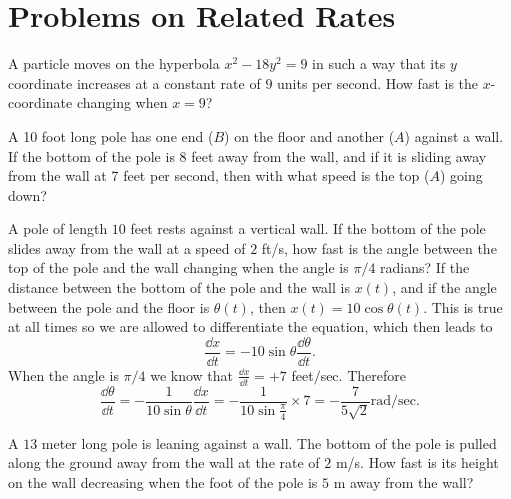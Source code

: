 

\section{Problems on Related Rates} 
\problemfont 
\begin{multicols}{2}\setlength{\parindent}{0pt}
\problem A particle moves on the hyperbola $x^2-18 y^2=9$ in such a way 
that its $y$ coordinate increases at a constant rate of $9$ units per
second. How fast is the $x$-coordinate changing when $x = 9$?
  
  
\problem A 10 foot long pole has one end ($B$) on the floor and another 
($A$) against a wall.  If the bottom of the pole is 8 feet away from the
wall, and if it is sliding away from the wall at 7 feet per second, then
with what speed is the top ($A$) going down?













\problem A pole of length $10$ feet rests against a vertical wall.  If 
the bottom of the pole slides away from the wall at a speed of $2$
ft/s, how fast is the angle between the top of the pole and the wall
changing when the angle is $\pi/4$ radians?
\answer 
If the distance between the bottom of the pole and the wall is $x(t)$,
and if the angle between the pole and the floor is $\theta(t)$, then
$x(t) = 10 \cos \theta(t)$.  This is true at all times so we are
allowed to differentiate the equation, which then leads to
\[
\frac{\dd x} {\dd t} = -10\sin\theta \frac{\dd \theta} {\dd t}.
\]
When the angle is $\pi/4$ we know that $\frac{\dd x} {\dd t} = +7$ feet$/$sec.
Therefore
\[
\frac{\dd \theta} {\dd t}
= -\frac{1} {10\sin\theta} \frac{\dd x} {\dd t}
= -\frac{1} {10\sin\frac\pi4} \times 7
= - \frac{7} {5\surd 2} \mathrm{rad}/\mathrm{sec}.
\]
\endanswer




\problem A $13$ meter long pole is leaning against a wall.  The bottom 
of the pole is pulled along the ground away from the wall at the rate
of $2$ m/s.  How fast is its height on the wall decreasing when the
foot of the pole is $5$ m away from the wall?









\end{multicols}

